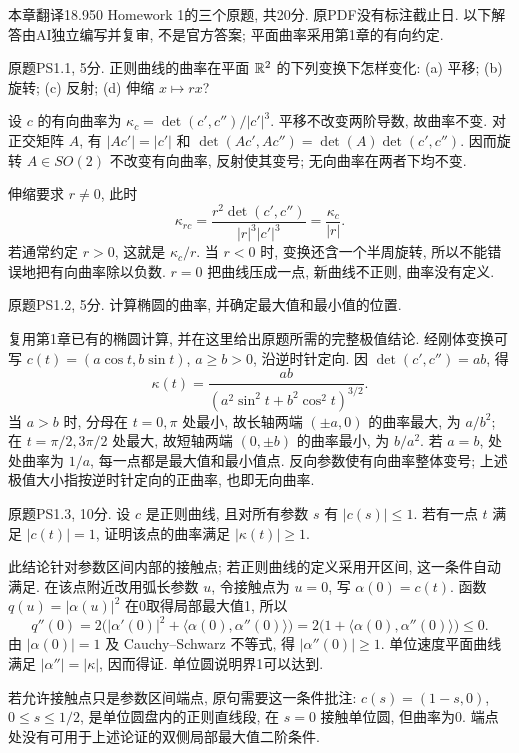 \par{}
本章翻译18.950 Homework 1的三个原题, 共20分. 原PDF没有标注截止日. 以下解答由AI独立编写并复审, 不是官方答案; 平面曲率采用第1章的有向约定.

\begin{exercise}\label{ps:1-1}
原题PS1.1, 5分. 正则曲线的曲率在平面 $\mathbb R^2$ 的下列变换下怎样变化: (a) 平移; (b) 旋转; (c) 反射; (d) 伸缩 $x\mapsto rx$?
\end{exercise}
\begin{solution}\label{pssol:1-1}
设 $c$ 的有向曲率为 $\kappa_c=\det(c',c'')/|c'|^3$. 平移不改变两阶导数, 故曲率不变. 对正交矩阵 $A$, 有 $|Ac'|=|c'|$ 和 $\det(Ac',Ac'')=\det(A)\det(c',c'')$. 因而旋转 $A\in SO(2)$ 不改变有向曲率, 反射使其变号; 无向曲率在两者下均不变.

伸缩要求 $r\ne0$, 此时
\[
 \kappa_{rc}=\frac{r^2\det(c',c'')}{|r|^3|c'|^3}
 =\frac{\kappa_c}{|r|}.
\]
若通常约定 $r>0$, 这就是 $\kappa_c/r$. 当 $r<0$ 时, 变换还含一个半周旋转, 所以不能错误地把有向曲率除以负数. $r=0$ 把曲线压成一点, 新曲线不正则, 曲率没有定义.
\end{solution}

\begin{exercise}\label{ps:1-2}
原题PS1.2, 5分. 计算椭圆的曲率, 并确定最大值和最小值的位置.
\end{exercise}
\begin{solution}\label{pssol:1-2}
复用第1章已有的椭圆计算, 并在这里给出原题所需的完整极值结论. 经刚体变换可写 $c(t)=(a\cos t,b\sin t)$, $a\ge b>0$, 沿逆时针定向. 因 $\det(c',c'')=ab$, 得
\[
 \kappa(t)=\frac{ab}{(a^2\sin^2t+b^2\cos^2t)^{3/2}}.
\]
当 $a>b$ 时, 分母在 $t=0,\pi$ 处最小, 故长轴两端 $(\pm a,0)$ 的曲率最大, 为 $a/b^2$; 在 $t=\pi/2,3\pi/2$ 处最大, 故短轴两端 $(0,\pm b)$ 的曲率最小, 为 $b/a^2$. 若 $a=b$, 处处曲率为 $1/a$, 每一点都是最大值和最小值点. 反向参数使有向曲率整体变号; 上述极值大小指按逆时针定向的正曲率, 也即无向曲率.
\end{solution}

\begin{exercise}\label{ps:1-3}
原题PS1.3, 10分. 设 $c$ 是正则曲线, 且对所有参数 $s$ 有 $|c(s)|\le1$. 若有一点 $t$ 满足 $|c(t)|=1$, 证明该点的曲率满足 $|\kappa(t)|\ge1$.
\end{exercise}
\begin{solution}\label{pssol:1-3}
此结论针对参数区间内部的接触点; 若正则曲线的定义采用开区间, 这一条件自动满足. 在该点附近改用弧长参数 $u$, 令接触点为 $u=0$, 写 $\alpha(0)=c(t)$. 函数 $q(u)=|\alpha(u)|^2$ 在0取得局部最大值1, 所以
\[
 q''(0)=2\bigl(|\alpha'(0)|^2+\langle\alpha(0),\alpha''(0)\rangle\bigr)
 =2\bigl(1+\langle\alpha(0),\alpha''(0)\rangle\bigr)\le0.
\]
由 $|\alpha(0)|=1$ 及 Cauchy--Schwarz 不等式, 得 $|\alpha''(0)|\ge1$. 单位速度平面曲线满足 $|\alpha''|=|\kappa|$, 因而得证. 单位圆说明界1可以达到.

若允许接触点只是参数区间端点, 原句需要这一条件批注: $c(s)=(1-s,0)$, $0\le s\le1/2$, 是单位圆盘内的正则直线段, 在 $s=0$ 接触单位圆, 但曲率为0. 端点处没有可用于上述论证的双侧局部最大值二阶条件.
\end{solution}
